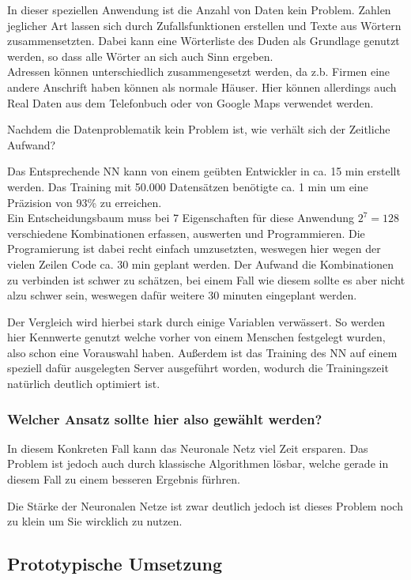 \documentclass[
]{article}
\begin{document}
In dieser speziellen Anwendung ist die Anzahl von Daten kein Problem.
Zahlen jeglicher Art lassen sich durch Zufallsfunktionen erstellen und
Texte aus Wörtern zusammensetzten. Dabei kann eine Wörterliste des Duden
als Grundlage genutzt werden, so dass alle Wörter an sich auch Sinn
ergeben. \\
Adressen können unterschiedlich zusammengesetzt werden, da z.b. Firmen
eine andere Anschrift haben können als normale Häuser. Hier können
allerdings auch Real Daten aus dem Telefonbuch oder von Google Maps
verwendet werden.

Nachdem die Datenproblematik kein Problem ist, wie verhält sich der
Zeitliche Aufwand?

Das Entsprechende NN kann von einem geübten Entwickler in ca. 15 min
erstellt werden. Das Training mit 50.000 Datensätzen benötigte ca. 1 min
um eine Präzision von 93\% zu erreichen. \\
Ein Entscheidungsbaum muss bei 7 Eigenschaften für diese Anwendung
\(2^7 = 128\) verschiedene Kombinationen erfassen, auswerten und
Programmieren. Die Programierung ist dabei recht einfach umzusetzten,
weswegen hier wegen der vielen Zeilen Code ca. 30 min geplant werden.
Der Aufwand die Kombinationen zu verbinden ist schwer zu schätzen, bei
einem Fall wie diesem sollte es aber nicht alzu schwer sein, weswegen
dafür weitere 30 minuten eingeplant werden.

Der Vergleich wird hierbei stark durch einige Variablen verwässert. So
werden hier Kennwerte genutzt welche vorher von einem Menschen
festgelegt wurden, also schon eine Vorauswahl haben. Außerdem ist das
Training des NN auf einem speziell dafür ausgelegten Server ausgeführt
worden, wodurch die Trainingszeit natürlich deutlich optimiert ist.

\hypertarget{header-n202}{%
\subsubsection{Welcher Ansatz sollte hier also gewählt
werden?}\label{header-n202}}

In diesem Konkreten Fall kann das Neuronale Netz viel Zeit ersparen. Das
Problem ist jedoch auch durch klassische Algorithmen lösbar, welche
gerade in diesem Fall zu einem besseren Ergebnis fürhren.

Die Stärke der Neuronalen Netze ist zwar deutlich jedoch ist dieses
Problem noch zu klein um Sie wircklich zu nutzen.

\hypertarget{header-n205}{%
\subsection{Prototypische Umsetzung}\label{header-n205}}
\end{document}
